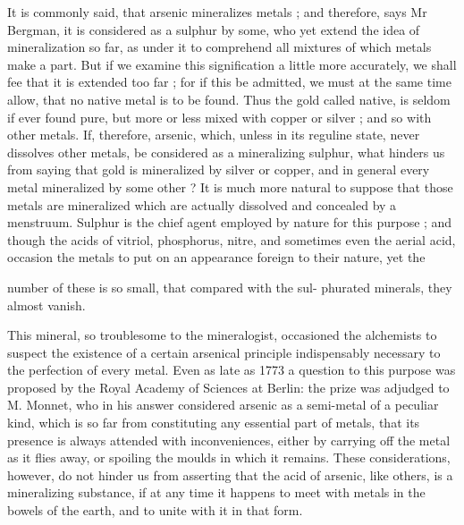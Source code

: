 \documentclass{article}
\begin{document}
It is commonly said, that arsenic mineralizes metals ; and therefore, says Mr Bergman, it is considered as a sulphur by some, who yet extend the idea of mineralization so far, as under it to comprehend all mixtures of which metals make a part. But if we examine this signification a little more accurately, we shall fee that it is extended too far ; for if this be admitted, we must at the same time allow, that no native metal is to be found. Thus the gold called native, is seldom if ever found pure, but more or less mixed with copper or silver ; and so with other metals. If, therefore, arsenic, which, unless in its reguline state, never dissolves other metals, be considered as a mineralizing sulphur, what hinders us from saying that gold is mineralized by silver or copper, and in general every metal mineralized by some other ? It is much more natural to suppose that those metals are mineralized which are actually dissolved and concealed by a menstruum. Sulphur is the chief agent employed by nature for this purpose ; and though the acids of vitriol, phosphorus, nitre, and sometimes even the aerial acid, occasion the metals to put on an appearance foreign to their nature, yet the

number of these is so small, that compared with the sul-
phurated minerals, they almost vanish.

This mineral, so troublesome to the mineralogist, occasioned the alchemists to suspect the existence of a certain arsenical principle indispensably necessary to the perfection of every metal. Even as late as 1773 a question to this purpose was proposed by the Royal Academy of Sciences at Berlin: the prize was adjudged to M. Monnet, who in his answer considered arsenic as a semi-metal of a peculiar kind, which is so far from constituting any essential part of metals, that its presence is always attended with inconveniences, either by carrying off the metal as it flies away, or spoiling the moulds in which it remains. These considerations, however, do not hinder us from asserting that the acid of arsenic, like others, is a mineralizing substance, if at any time it happens to meet with metals in the bowels of the earth, and to unite with it in that form.
\end{document}
